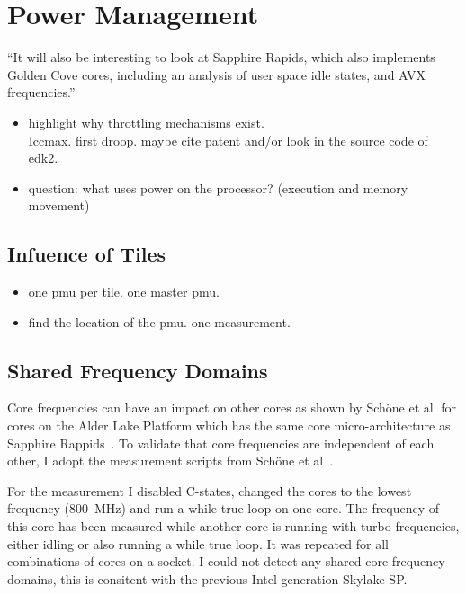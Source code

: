 \chapter{Power Management}
``It will also be interesting to look at Sapphire Rapids, which also implements Golden Cove cores, including an analysis of user space idle states, and AVX frequencies.''


\begin{itemize}
    \item highlight why throttling mechanisms exist.\\
    Iccmax. first droop. maybe cite patent and/or look in the source code of edk2.
    \item question: what uses power on the processor? (execution and memory movement)
\end{itemize}


\section{Infuence of Tiles}
\begin{itemize}
    \item one pmu per tile. one master pmu.
    \item find the location of the pmu. one measurement.
\end{itemize}

\section{Shared Frequency Domains}
Core frequencies can have an impact on other cores as shown by Schöne et al. for cores on the Alder Lake Platform which has the same core micro-architecture as Sapphire Rappids~\cite{Schoene_2024_Alder_Lake}.
To validate that core frequencies are independent of each other, I adopt the measurement scripts from Sch\"one et al~\cite{Schoene_2024_Alder_Lake}.

For the measurement I disabled C-states, changed the cores to the lowest frequency (\SI{800}{\MHz}) and run a while true loop on one core.
The frequency of this core has been measured while another core is running with turbo frequencies, either idling or also running a while true loop.
It was repeated for all combinations of cores on a socket.
I could not detect any shared core frequency domains, this is consitent with the previous Intel generation Skylake-SP.

